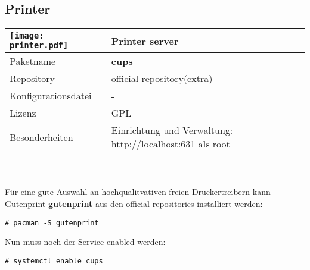\subsection{Printer}
\begin{tabular}{l|l}
\texttt{[image: printer.pdf]} & Printer server \\ \hline
Paketname & \textbf{cups} \\ 
Repository & official repository(extra) \\
Konfigurationsdatei & - \\
Lizenz & GPL \\
Besonderheiten & Einrichtung und Verwaltung: http://localhost:631 als root \\
\end{tabular}
\\ \\
Für eine gute Auswahl an hochqualitvativen freien Druckertreibern kann Gutenprint \textbf{gutenprint}
aus den official repositories installiert werden:
\begin{lstlisting}[style=Bash]
# pacman -S gutenprint 
\end{lstlisting}
Nun muss noch der Service enabled werden:
\begin{lstlisting}[style=Bash]
# systemctl enable cups
\end{lstlisting}
